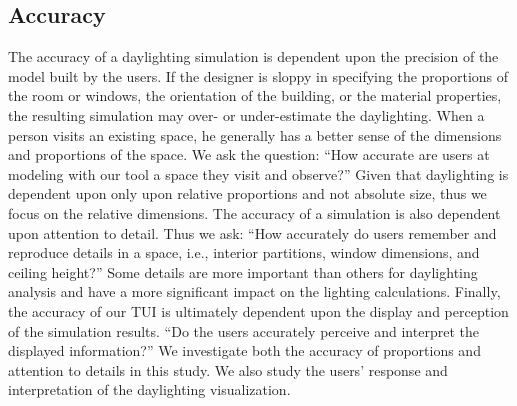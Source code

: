 \documentclass[review]{vgtc}                 %
\begin{document}



\subsection{Accuracy}


The accuracy of a daylighting simulation is dependent upon the
precision of the model built by the users.  If the designer is sloppy
in specifying the proportions of the room or windows, the orientation
of the building, or the material properties, the resulting simulation
may over- or under-estimate the daylighting.  When a person visits an
existing space, he generally has a better sense of the dimensions and
proportions of the space.  We ask the question: ``How accurate are
users at modeling with our tool a space they visit and observe?''
Given that daylighting is dependent upon only upon relative
proportions and not absolute size, thus we focus on the relative
dimensions.  The accuracy of a simulation is also dependent upon
attention to detail.  Thus we ask: ``How accurately do users remember
and reproduce details in a space, i.e., interior partitions, window
dimensions, and ceiling height?''  Some details are more important
than others for daylighting analysis and have a more significant
impact on the lighting calculations.  Finally, the accuracy of our TUI
is ultimately dependent upon the display and perception of the
simulation results.  ``Do the users accurately perceive and interpret
the displayed information?''  We investigate both the accuracy of
proportions and attention to details in this study.  We also study the
users' response and interpretation of the daylighting visualization.
\end{document}
